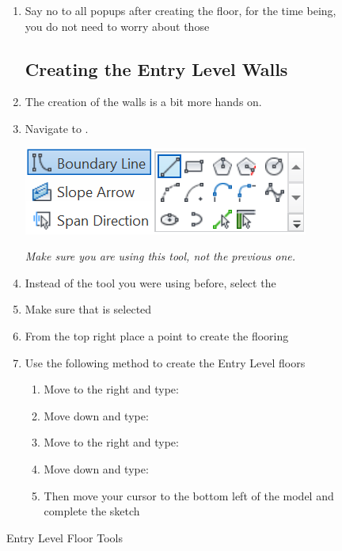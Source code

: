 \documentclass{tufte-book} %
\begin{document}
\begin{figure}
\begin{enumerate}

	\item Say no to all popups after creating the floor, for the time being, you do not need to worry about those


	\subsection{Creating the Entry Level Walls}
	\item The creation of the  walls is a bit more hands on.
	\item Navigate to .

	\begin{marginfigure}
		\includegraphics[width=\linewidth]{revitupperfloortool.png}
		\caption{Entry Level Floor Tools}
		\emph{Make sure you are using this tool, not the previous one.}
		\label{fig:revupperlevelfloortool}
	\end{marginfigure}

	\item Instead of the tool you were using before, select the 
	\item Make sure that  is selected
	\item From the top right place a point to create the flooring
	\item Use the following method to create the Entry Level floors

	\begin{enumerate}
		\item Move to the right and type: 
		\item Move down and type: 
		\item Move to the right and type: 
		\item Move down and type: 
		\item Then move your cursor to the bottom left of the model and complete the sketch
	\end{enumerate}


\end{enumerate}
\end{figure}
\end{document}
